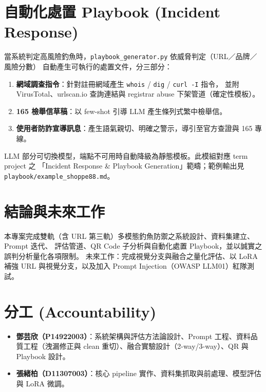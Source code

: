 \documentclass[11pt]{ctexart}
\begin{document}
\section{自動化處置 Playbook (Incident Response)}
當系統判定高風險釣魚時，\texttt{playbook\_generator.py} 依威脅判定（URL／品牌／風險分數）
自動產生可執行的處置文件，分三部分：
\begin{enumerate}[leftmargin=1.4em]
\item \textbf{網域調查指令}：針對註冊網域產生 \texttt{whois} / \texttt{dig} / \texttt{curl -I} 指令，
並附 VirusTotal、urlscan.io 查詢連結與 registrar abuse 下架管道（確定性模板）。
\item \textbf{165 檢舉信草稿}：以 few-shot 引導 LLM 產生條列式繁中檢舉信。
\item \textbf{使用者防詐宣導訊息}：產生語氣親切、明確之警示，導引至官方查證與 165 專線。
\end{enumerate}
LLM 部分可切換模型，端點不可用時自動降級為靜態模板。此模組對應 term project 之
「Incident Response \& Playbook Generation」範疇；範例輸出見 \texttt{playbook/example\_shoppe88.md}。

\section{結論與未來工作}
本專案完成雙軌（含 URL 第三軌）多模態釣魚防禦之系統設計、資料集建立、Prompt 迭代、
評估管道、QR Code 子分析與自動化處置 Playbook，並以誠實之誤判分析量化各項限制。
未來工作：完成視覺分支與融合之量化評估、以 LoRA 補強 URL 與視覺分支，以及加入
Prompt Injection（OWASP LLM01）紅隊測試。

\section*{分工 (Accountability)}
\begin{itemize}[leftmargin=1.4em]
\item \textbf{鄧芸欣（P14922003）}：系統架構與評估方法論設計、Prompt 工程、資料品質工程（洩漏修正與 clean 重切）、融合實驗設計（2-way/3-way）、QR 與 Playbook 設計。
\item \textbf{張緒柏（D11307003）}：核心 pipeline 實作、資料集抓取與前處理、模型評估與 LoRA 微調。
\end{itemize}
\end{document}

